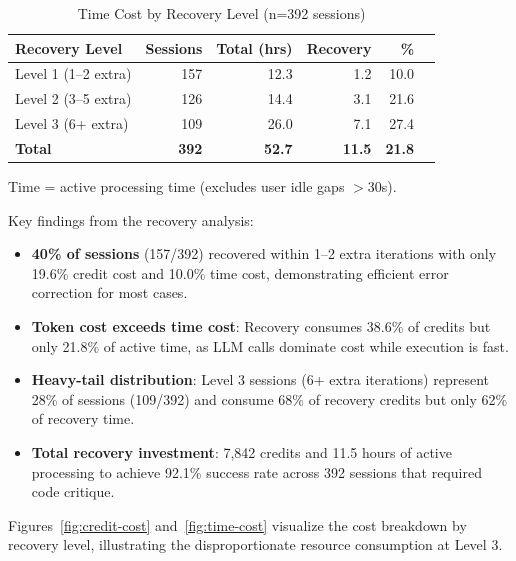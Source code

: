 \documentclass[sigconf]{acmart}
\begin{document}
\begin{table}[H]
\centering
\caption{Time Cost by Recovery Level (n=392 sessions)}
\label{tab:recovery-time}
\small
\begin{tabular}{@{}lrrrrr@{}}
\toprule
\textbf{Recovery Level} & \textbf{Sessions} & \textbf{Total (hrs)} & \textbf{Recovery} & \textbf{\%} \\
\midrule
Level 1 (1--2 extra) & 157 & 12.3 & 1.2 & 10.0 \\
Level 2 (3--5 extra) & 126 & 14.4 & 3.1 & 21.6 \\
Level 3 (6+ extra) & 109 & 26.0 & 7.1 & 27.4 \\
\midrule
\textbf{Total} & \textbf{392} & \textbf{52.7} & \textbf{11.5} & \textbf{21.8} \\
\bottomrule
\end{tabular}
\par\vspace{2pt}\noindent\footnotesize{Time = active processing time (excludes user idle gaps $>$30s).}
\end{table}

Key findings from the recovery analysis:

\begin{itemize}
  \item \textbf{40\% of sessions} (157/392) recovered within 1--2 extra iterations with only 19.6\% credit cost and 10.0\% time cost, demonstrating efficient error correction for most cases.
  \item \textbf{Token cost exceeds time cost}: Recovery consumes 38.6\% of credits but only 21.8\% of active time, as LLM calls dominate cost while execution is fast.
  \item \textbf{Heavy-tail distribution}: Level 3 sessions (6+ extra iterations) represent 28\% of sessions (109/392) and consume 68\% of recovery credits but only 62\% of recovery time.
  \item \textbf{Total recovery investment}: 7,842 credits and 11.5 hours of active processing to achieve 92.1\% success rate across 392 sessions that required code critique.
\end{itemize}

Figures~\ref{fig:credit-cost} and~\ref{fig:time-cost} visualize the cost breakdown by recovery level, illustrating the disproportionate resource consumption at Level 3.
\end{document}
